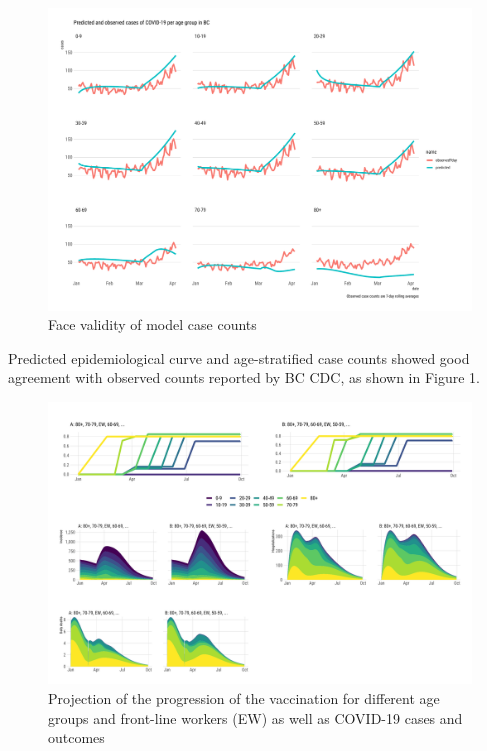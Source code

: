 \documentclass[]{interact}
\theoremstyle{plain}%
\theoremstyle{definition}
\theoremstyle{remark}
\begin{document}
\begin{figure}

{\centering \includegraphics[width=1\linewidth]{../figures/fig-validation} 

}

\caption{Face validity of model case counts}\label{fig:figValidation}
\end{figure}

Predicted epidemiological curve and age-stratified case counts showed
good agreement with observed counts reported by BC CDC, as shown in
Figure 1.

\begin{figure}

{\centering \includegraphics[width=1\linewidth]{../figures/fig-trajectoriesFull} 

}

\caption{Projection of the progression of the vaccination for different age groups and front-line workers (EW) as well as COVID-19 cases and outcomes}\label{fig:fig1}
\end{figure}
\end{document}
